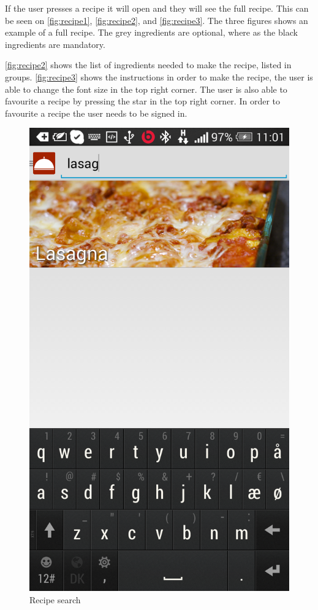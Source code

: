 If the user presses a recipe it will open and they will see the full recipe. This can be seen on \autoref{fig:recipe1}, \autoref{fig:recipe2}, and \autoref{fig:recipe3}. The three figures shows an example of a full recipe. The grey ingredients are optional, where as the black ingredients are mandatory. 


\autoref{fig:recipe2} shows the list of ingredients needed to make the recipe, listed in groups. \autoref{fig:recipe3} shows the instructions in order to make the recipe, the user is able to change the font size in the top right corner. The user is also able to favourite a recipe by pressing the star in the top right corner. In order to favourite a recipe the user needs to be signed in.

\begin{figure}[H]
\begin{minipage}[t]{0.5\columnwidth}
\centering
\includegraphics[width=0.7\columnwidth]{img/screenshots/finalrecipesearch.png}
\caption{Recipe search\label{fig:recipesearch}}
\end{minipage}
\hspace{0.5cm}

\end{figure}
